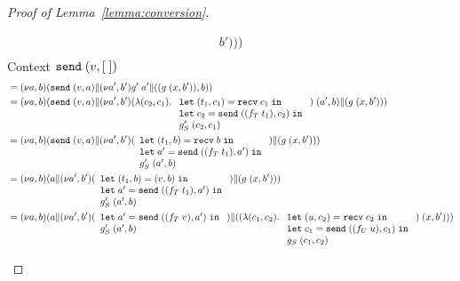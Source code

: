 \begin{proof}[Proof of Lemma~\ref{lemma:conversion}]
\begin{enumerate}
\begin{itemize}
\begin{align*}
{{{{        b') })}}})  \\
      \end{align*}
      Context $\mathtt{send}\; (v,[\;])$
      \begin{align*}
        &= \PScope ({\PPar {\ESend va} {\PScope[a',b'] \PPar {g' \; a'} {(({ g \; (x,
        b') }), b)}}})  \\
        &= \PScope ({\PPar {\ESend va} {\PScope[a',b'] \PPar {(
          \ELam {(c_2, c_1)}
          \begin{array}[t]{l}
        \ELetP {t_1} {c_1} {\ERecv{c_1}} \\
        \ELet {c_2} {\ESend {(f_T \; t_1)} {c_2}} \\
          g'_S \; (c_2, c_1)
          \end{array}
          ) \; (a', b)} {({ g \; (x,
        b') })}}})  \\
        &= \PScope ({\PPar {\ESend va} {\PScope[a',b'] \PPar {(
          \begin{array}[t]{l}
        \ELetP {t_1} {b} {\ERecv{b}} \\
        \ELet {a'} {\ESend {(f_T \; t_1)} {a'}} \\
          g'_S \; (a', b)
          \end{array}
          )} {({ g \; (x,
        b') })}}})  \\
        &= \PScope ({\PPar {a} {\PScope[a',b'] \PPar {(
          \begin{array}[t]{l}
        \ELetP {t_1} {b} {(v,{b})} \\
        \ELet {a'} {\ESend {(f_T \; t_1)} {a'}} \\
          g'_S \; (a', b)
          \end{array}
          )} {({ g \; (x,
        b') })}}})  \\
        &= \PScope ({\PPar {a} {\PScope[a',b'] \PPar {(
          \begin{array}[t]{l}
        \ELet {a'} {\ESend {(f_T \; v)} {a'}} \\
          g'_S \; (a', b)
          \end{array}
        )} {({ (
\ELam {(c_1, c_2)}
        \begin{array}[t]{l}
          \ELetP {u} {c_2} {\ERecv{c_2}} \\
        \ELet {c_1} {\ESend {(f_U \; u)} {c_1}}  \\
        g_S \; (c_1, c_2)
        \end{array}
        ) \; (x,
        b') })}}})  \\

\end{align*}
\end{itemize}
\end{enumerate}
\end{proof}
